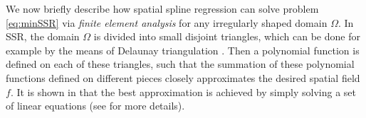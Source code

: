 
We now briefly describe how spatial spline regression \cite{Sanga13} can solve problem \eqref{eq:minSSR} via \emph{finite element analysis} for any irregularly shaped domain $\Omega$. 
In SSR, the domain $\Omega$ is divided into small disjoint triangles, which can be done for example by the means of Delaunay triangulation \cite{hje06}. Then a polynomial function is defined on each of these triangles, such that the summation of these polynomial functions defined on different pieces closely approximates the desired spatial field $f$. It is shown in \cite{Sanga13} that the best approximation is achieved by simply solving a set of linear equations (see \cite{Sanga13} for more details).


